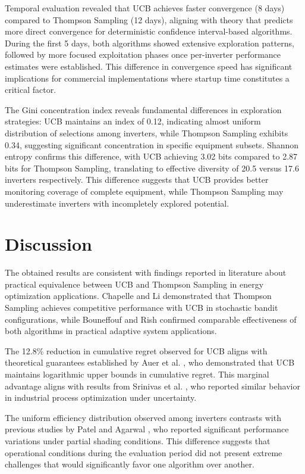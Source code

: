 \documentclass[conference]{IEEEtran}
\begin{document}
Temporal evaluation revealed that UCB achieves faster convergence (8 days) compared to Thompson Sampling (12 days), aligning with theory that predicts more direct convergence for deterministic confidence interval-based algorithms. During the first 5 days, both algorithms showed extensive exploration patterns, followed by more focused exploitation phases once per-inverter performance estimates were established. This difference in convergence speed has significant implications for commercial implementations where startup time constitutes a critical factor.

The Gini concentration index reveals fundamental differences in exploration strategies: UCB maintains an index of 0.12, indicating almost uniform distribution of selections among inverters, while Thompson Sampling exhibits 0.34, suggesting significant concentration in specific equipment subsets. Shannon entropy confirms this difference, with UCB achieving 3.02 bits compared to 2.87 bits for Thompson Sampling, translating to effective diversity of 20.5 versus 17.6 inverters respectively. This difference suggests that UCB provides better monitoring coverage of complete equipment, while Thompson Sampling may underestimate inverters with incompletely explored potential.

\section{Discussion}

The obtained results are consistent with findings reported in literature about practical equivalence between UCB and Thompson Sampling in energy optimization applications. Chapelle and Li \cite{chapelle2011} demonstrated that Thompson Sampling achieves competitive performance with UCB in stochastic bandit configurations, while Bouneffouf and Rish \cite{bouneffouf2019} confirmed comparable effectiveness of both algorithms in practical adaptive system applications.

The 12.8\% reduction in cumulative regret observed for UCB aligns with theoretical guarantees established by Auer et al. \cite{auer2002}, who demonstrated that UCB maintains logarithmic upper bounds in cumulative regret. This marginal advantage aligns with results from Srinivas et al. \cite{srinivas2021}, who reported similar behavior in industrial process optimization under uncertainty.

The uniform efficiency distribution observed among inverters contrasts with previous studies by Patel and Agarwal \cite{patel2020}, who reported significant performance variations under partial shading conditions. This difference suggests that operational conditions during the evaluation period did not present extreme challenges that would significantly favor one algorithm over another.
\end{document}

